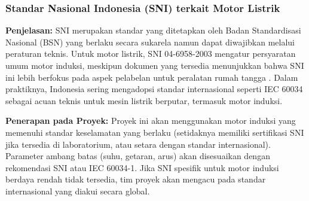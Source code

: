 \documentclass{elsinta}
\begin{document}
\subsubsection{Standar Nasional Indonesia (SNI) terkait Motor Listrik}

\textbf{Penjelasan:} SNI merupakan standar yang ditetapkan oleh Badan Standardisasi Nasional (BSN) yang berlaku secara sukarela namun dapat diwajibkan melalui peraturan teknis. Untuk motor listrik, SNI 04-6958-2003 mengatur persyaratan umum motor induksi, meskipun dokumen yang tersedia menunjukkan bahwa SNI ini lebih berfokus pada aspek pelabelan untuk peralatan rumah tangga \cite{sni_6958_2003}. Dalam praktiknya, Indonesia sering mengadopsi standar internasional seperti IEC 60034 sebagai acuan teknis untuk mesin listrik berputar, termasuk motor induksi.

\textbf{Penerapan pada Proyek:} Proyek ini akan menggunakan motor induksi yang memenuhi standar keselamatan yang berlaku (setidaknya memiliki sertifikasi SNI jika tersedia di laboratorium, atau setara dengan standar internasional). Parameter ambang batas (suhu, getaran, arus) akan disesuaikan dengan rekomendasi SNI atau IEC 60034-1. Jika SNI spesifik untuk motor induksi berdaya rendah tidak tersedia, tim proyek akan mengacu pada standar internasional yang diakui secara global.
\section{\ReferencesTitle}
\renewcommand{\refname}{}      %





\section{\AbbrevTitle}
\end{document}
